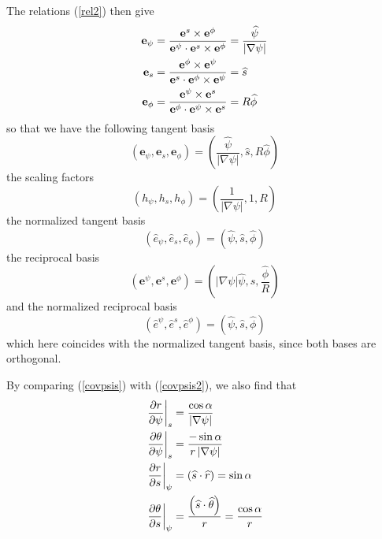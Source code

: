 The relations (\ref{rel2}) then give 
\begin{align}
\mathbf{e}_{\psi} & =\frac{\mathbf{e}^{s}\times\mathbf{e}^{\phi}}{\mathbf{e}%
^{\psi}\cdot\mathbf{e}^{s}\times\mathbf{e}^{\phi}}=\frac {\widehat{\psi}}{%
\left| \nabla\psi\right| }  \label{covpsis2} \\
\mathbf{e}_{s} & =\frac{\mathbf{e}^{\phi}\times\mathbf{e}^{\psi}}{\mathbf{e}%
^{s}\cdot\mathbf{e}^{\phi}\times\mathbf{e}^{\psi}}=\widehat {s}  \notag \\
\mathbf{e}_{\phi} & =\frac{\mathbf{e}^{\psi}\times\mathbf{e}^{s}}{\mathbf{e}%
^{\phi}\cdot\mathbf{e}^{\psi}\times\mathbf{e}^{s}}=R\widehat{\phi }  \notag
\end{align}
so that we have the following tangent basis 
\begin{equation}
\left( \mathbf{e}_{\psi},\mathbf{e}_{s},\mathbf{e}_{\phi}\right) =\left( 
\frac{\widehat{\psi}}{\left| \nabla\psi\right| },\widehat{s},R\widehat{\phi}
\right)
\end{equation}
the scaling factors 
\begin{equation}
\left( h_{\psi},h_{s},h_{\phi}\right) =\left( \frac{1}{\left| \nabla
\psi\right| },1,R\right)
\end{equation}
the normalized tangent basis 
\begin{equation}
\left( \widehat{e}_{\psi},\widehat{e}_{s},\widehat{e}_{\phi}\right) =\left( 
\widehat{\psi},\widehat{s},\widehat{\phi}\right)
\end{equation}
the reciprocal basis 
\begin{equation}
\left( \mathbf{e}^{\psi},\mathbf{e}^{s},\mathbf{e}^{\phi}\right) =\left(
\left| \nabla\psi\right| \widehat{\psi},\widehat{s},\frac{\widehat{\phi}}{R}
\right)
\end{equation}
and the normalized reciprocal basis 
\begin{equation}
\left( \widehat{e}^{\psi},\widehat{e}^{s},\widehat{e}^{\phi}\right) =\left( 
\widehat{\psi},\widehat{s},\widehat{\phi}\right)
\end{equation}
which here coincides with the normalized tangent basis, since both bases are
orthogonal.

By comparing (\ref{covpsis}) with (\ref{covpsis2}), we also find that 
\begin{align}
\left. \frac{\partial r}{\partial\psi}\right| _{s} & =\frac{\cos\alpha }{%
\left| \nabla\psi\right| } \\
\left. \frac{\partial\theta}{\partial\psi}\right| _{s} & =\frac {-\sin\alpha%
}{r\left| \nabla\psi\right| } \\
\left. \frac{\partial r}{\partial s}\right| _{\psi} & =\left( \widehat{s}
\cdot\widehat{r}\right) =\sin\alpha \\
\left. \frac{\partial\theta}{\partial s}\right| _{\psi} & =\frac{\left( 
\widehat{s}\cdot\widehat{\theta}\right) }{r}=\frac{\cos\alpha}{r}
\end{align}

